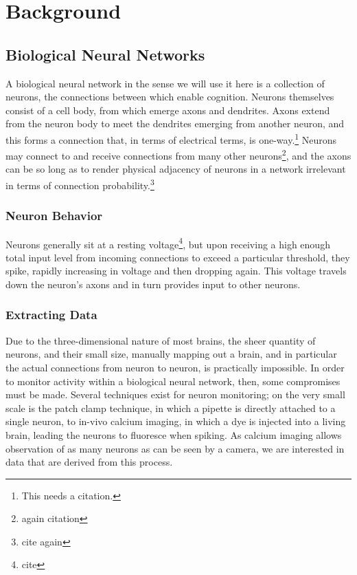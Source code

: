 \graphicspath{{resources/}}

\chapter{Background}

\section{Biological Neural Networks}
\label{sec:bioNN}
A biological neural network in the sense we will use it here is a collection of 
neurons, the connections between which enable cognition. Neurons themselves 
consist of a cell body, from which emerge axons and dendrites. Axons extend from 
the neuron body to meet the dendrites emerging from another neuron, and this 
forms a connection that, in terms of electrical terms, is one-way.\footnote{This 
needs a citation.} Neurons may connect to and receive connections from many 
other neurons\footnote{again citation}, and the axons can be so long as to 
render physical adjacency of neurons in a network irrelevant in terms of 
connection probability.\footnote{cite again}

\subsection{Neuron Behavior}
Neurons generally sit at a resting voltage\footnote{cite}, but upon receiving a 
high enough total input level from incoming connections to exceed a particular 
threshold, they spike, rapidly increasing in voltage and then dropping again.  
This voltage travels down the neuron's axons and in turn provides input to other 
neurons.
\subsection{Extracting Data}
Due to the three-dimensional nature of most brains, the sheer quantity of 
neurons, and their small size, manually mapping out a brain, and in particular 
the actual connections from neuron to neuron, is practically impossible. In 
order to monitor activity within a biological neural network, then, some 
compromises must be made. Several techniques exist for neuron monitoring; on the 
very small scale is the patch clamp technique, in which a pipette is directly 
attached to a single neuron\cite{neher1992patch}, to in-vivo calcium imaging, in 
which a dye is injected into a living brain, leading the neurons to fluoresce 
when spiking\cite{Stosiek7319}. As calcium imaging allows observation of as many 
neurons as can be seen by a camera, we are interested in data that are derived 
from this process.


